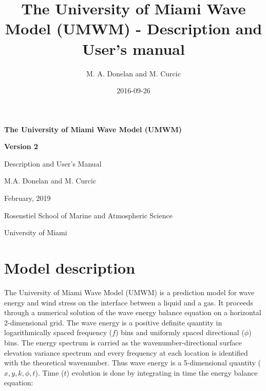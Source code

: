 \documentclass[letterpaper]{article}
\title{The University of Miami Wave Model (UMWM) - Description and User's manual}
\author{M. A. Donelan and M. Curcic}
\date{2016-09-26}
\numberwithin{equation}{section}
\begin{document}
\begin{titlepage}
\begin{center}
\vspace{5 cm}
\textbf{\large The University of Miami Wave Model (UMWM)}

\textbf{\large Version 2}

\vspace{0.5 cm}
Description and User's Manual

\vspace{1 cm}
M.A. Donelan and M. Curcic

\vspace{12 cm}
February, 2019

\vspace{0.5 cm}
Rosenstiel School of Marine and Atmospheric Science

University of Miami

\end{center}
\end{titlepage}

\newpage

\tableofcontents
\setcounter{tocdepth}{0}

\newpage

\section{Model description}
\label{sec:model_description}

The University of Miami Wave Model (UMWM) is a prediction model for wave energy and wind stress on the interface between a liquid and a gas. 
It proceeds through a numerical solution of the wave energy balance equation on a horizontal 2-dimensional grid. 
The wave energy is a positive definite quantity in logarithmically spaced frequency ($f$) bins and uniformly spaced directional ($\phi$) bins. 
The energy spectrum is carried as the wavenumber-directional surface elevation variance spectrum and every frequency at each location is identified with the theoretical wavenumber. 
Thus wave energy is a 5-dimensional quantity ($x,y,k,\phi,t$). 
Time ($t$) evolution is done by integrating in time the energy balance equation:
\end{document}
